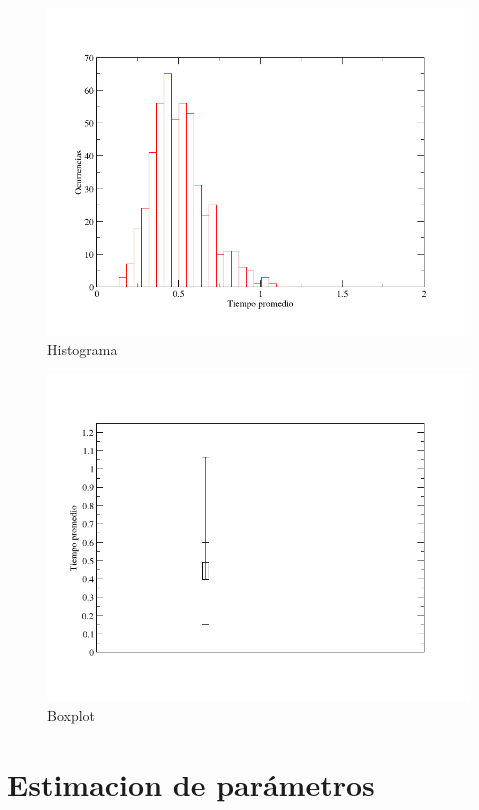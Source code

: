 \documentclass[10pt,a4paper]{article}
\begin{document}
\begin{figure}
  \centering
  \includegraphics[scale=0.5]{histogram.png} 
  \caption{Histograma}
  \label{histogram}
\end{figure}

\begin{figure}
  \centering
  \includegraphics[scale=0.5]{boxplot.png} 
  \caption{Boxplot}
  \label{boxplot}
\end{figure}

\section{Estimacion de par\'ametros}
\end{document}
